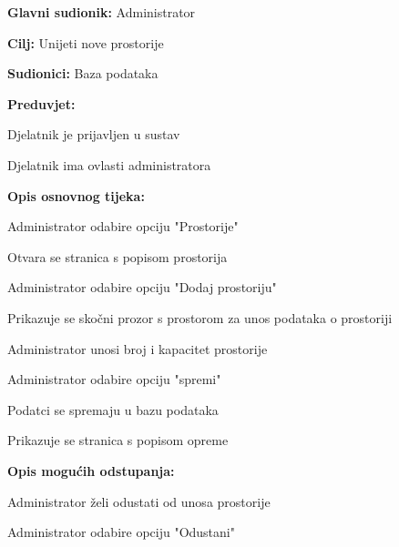				\noindent {}
				\begin{packed_item}
					
					\item \textbf{Glavni sudionik: }Administrator
					\item  \textbf{Cilj: }Unijeti nove prostorije
					\item  \textbf{Sudionici: }Baza podataka
					\item  \textbf{Preduvjet: }
					\item[] \begin{packed_enum}
						
						\item[-] Djelatnik je prijavljen u sustav
						\item[-] Djelatnik ima ovlasti administratora
					\end{packed_enum}
					\item  \textbf{Opis osnovnog tijeka: }
					
					\item[] \begin{packed_enum}
						\item Administrator odabire opciju "Prostorije"
						\item Otvara se stranica s popisom prostorija
						\item Administrator odabire opciju "Dodaj prostoriju"
						\item Prikazuje se skočni prozor s prostorom za unos podataka o prostoriji
						\item Administrator unosi broj i kapacitet prostorije
						\item Administrator odabire opciju "spremi"
						\item Podatci se spremaju u bazu podataka
						\item Prikazuje se stranica s popisom opreme
					\end{packed_enum}
					
					\item  \textbf{Opis mogućih odstupanja:}
					
					\item[] \begin{packed_item}
						
						\item[6.a] Administrator želi odustati od unosa prostorije 
						\item[] \begin{packed_enum}
							\item Administrator odabire opciju "Odustani"
							\end{packed_enum}
					\end{packed_item}
				\end{packed_item}
				
